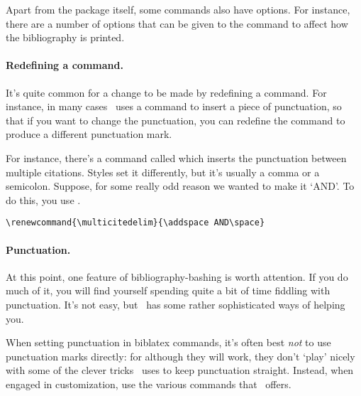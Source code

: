 Apart from the package itself, some commands also have options. For
instance, there are a number of options that can be given to the
 command to affect how the bibliography is
printed.

\paragraph{Redefining a command.} It's quite common for a change to be
made by redefining a command. For instance, in many cases \biblatex\
uses a command to insert a piece of punctuation, so that if you want
to change the punctuation,\intref{See p~\pageref{sec:punctuation}.} you can redefine the command to produce a
different punctuation mark.

For instance, there's a command called  which
inserts the punctuation between multiple citations. Styles set it
differently, but it's usually a comma or a semicolon. Suppose, for
some really odd reason we wanted to make it `AND'. To do this, you use .
\begin{verbatim}
\renewcommand{\multicitedelim}{\addspace AND\space}
\end{verbatim}

\paragraph{Punctuation.} At this point, one feature of
bibliography-bashing is worth attention. If you do much of it, you
will find yourself spending quite a bit of time fiddling with
punctuation. It's not easy, but \biblatex\ has some rather
sophisticated ways of helping you.

When setting punctuation in biblatex commands, it's often best
\emph{not} to use punctuation marks directly: for although they will
work, they don't `play' nicely with some of the clever tricks
\biblatex\ uses to keep punctuation straight. Instead, when engaged in
customization, use the various commands that \biblatex\ offers.

